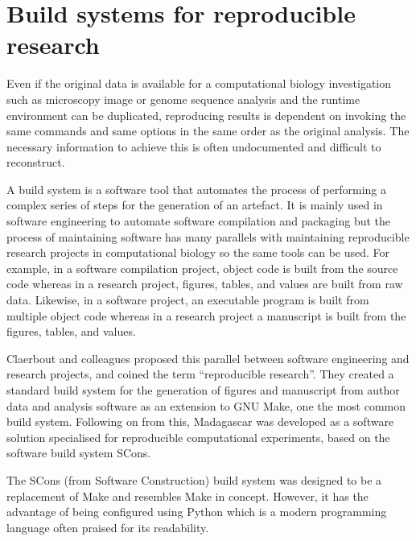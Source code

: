 \section{Build systems for reproducible research}

Even if the original data is available for a computational biology
investigation such as microscopy image or genome sequence analysis
and the runtime environment can be duplicated, reproducing results
is dependent on invoking the same commands and same
options in the same order as the original analysis.
The necessary information to achieve this is often undocumented
and difficult to reconstruct.

A build system is a software tool that automates the process of
performing a complex series of steps for the generation of an artefact.
It is mainly used in software engineering to automate software
compilation and packaging
but the process of maintaining software has many parallels with
maintaining reproducible research projects in computational biology
so the same tools
can be used.  For example,
in a software compilation project, object code is built from the
source code whereas in a research project, figures, tables, and values
are built from raw
data.  Likewise,
in a software project, an executable program is built from multiple
object code whereas in a research project a manuscript is built from the
figures, tables, and values.

Claerbout and colleagues \citep{ReDoc-claerbout} proposed this
parallel between software engineering and research projects, and
coined the term ``reproducible research''.  They created a standard
build system for the generation of figures and manuscript from author
data and analysis software as an extension to GNU
Make, one the most common build system.  Following on from this,
Madagascar \citep{madagascar-scons} was developed as a
software solution specialised
for reproducible computational experiments, based on the software
build system SCons.

The SCons (from Software Construction) build
system \citep{scons} was designed to be a
replacement of Make and resembles Make in concept.  However, it has
the advantage of being configured using Python which is a modern
programming language often praised for its readability.

